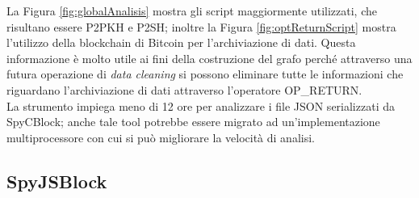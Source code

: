 La Figura \ref{fig:globalAnalisis} mostra gli script maggiormente utilizzati, che risultano essere P2PKH e  P2SH; inoltre la Figura \ref{fig:optReturnScript} mostra l'utilizzo della blockchain di Bitcoin per l'archiviazione di dati. Questa informazione è molto utile ai fini della costruzione del grafo perché attraverso una futura operazione di \emph{data cleaning} si possono eliminare tutte le informazioni che riguardano l'archiviazione di dati attraverso l'operatore OP\_RETURN.\\
La strumento impiega meno di 12 ore per analizzare i file JSON serializzati da SpyCBlock; anche tale tool potrebbe essere migrato ad un'implementazione multiprocessore con cui si può migliorare la velocità di analisi.

\subsection{SpyJSBlock} \label{sec:SpyJSBlock}

